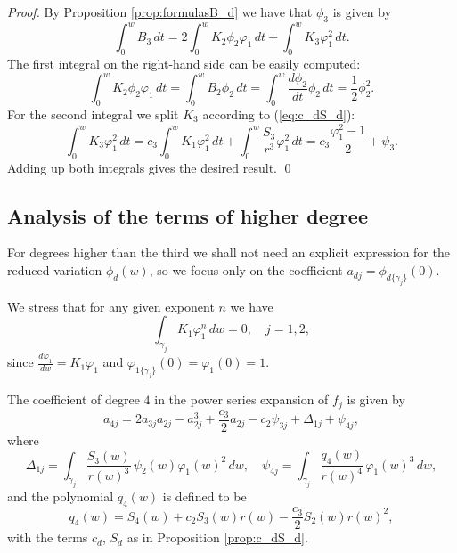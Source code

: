 \begin{proof}
By Proposition \ref{prop:formulasB_d} we have that $\phi_3$ is given by
\[ \int_0^w B_3\,dt=2\int_0^w K_2\phi_2\varphi_1\,dt+\int_0^w K_3\varphi_1^2\,dt. \]
The first integral on the right-hand side can be easily computed:
\[ \int_0^w K_2\phi_2\varphi_1\,dt=\int_0^w B_2\phi_2\,dt=\int_0^w\frac{d\phi_2}{dt}\phi_2\,dt=\frac{1}{2}\phi_2^2. \]
For the second integral we split $K_3$ according to (\ref{eq:c_dS_d}):
\[ \int_0^w K_3\varphi_1^2\,dt=c_3\int_0^wK_1\varphi_1^2\,dt+\int_0^w\frac{S_3}{r^3}\varphi_1^2\,dt=c_3\frac{\varphi_1^2-1}{2}+\psi_3. \]
Adding up both integrals gives the desired result. \qed
\end{proof}





\subsection{Analysis of the terms of higher degree}


For degrees higher than the third we shall not need an explicit expression for the reduced variation $\phi_d(w)$, so we focus only on the coefficient $a_{dj}=\phi_{d\{\gamma_j\}}(0)$. 

We stress that for any given exponent $n$ we have
\[ \int_{\gamma_j}K_1\varphi_1^n\,dw=0, \quad j=1,2, \]
since $\frac{d\varphi_1}{dw}=K_1\varphi_1$ and $\varphi_{1\{\gamma_j\}}(0)=\varphi_1(0)=1$.


\begin{proposition}\label{prop:fourthvar}
The coefficient of degree $4$ in the power series expansion of $f_j$ is given by
\[ a_{4j}=2a_{3j}a_{2j}-a_{2j}^3+\frac{c_3}{2}a_{2j}-c_2\psi_{3j}+\Delta_{1j}+\psi_{4j}, \]
where
\[ \Delta_{1j}=\int_{\gamma_j}\frac{S_3(w)}{r(w)^3}\,\psi_2(w)\varphi_1(w)^2\,dw, \quad \psi_{4j}=\int_{\gamma_j}\frac{q_4(w)}{r(w)^4}\,\varphi_1(w)^3\,dw,   \]
and the polynomial $q_4(w)$ is defined to be
\[ q_4(w)=S_4(w)+c_2S_3(w)r(w)-\frac{c_3}{2}S_2(w)r(w)^2, \]
with the terms $c_d$, $S_d$ as in Proposition \textnormal{\ref{prop:c_dS_d}}.
\end{proposition}

